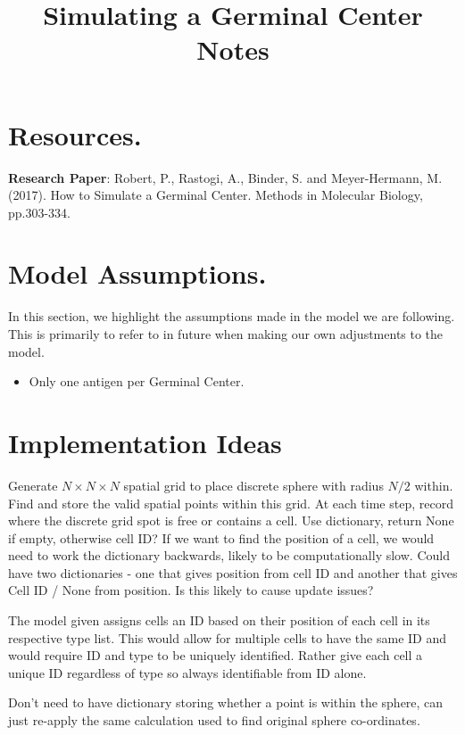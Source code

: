 \documentclass[english]{article}
\begin{document}
\title{Simulating a Germinal Center Notes}
\maketitle

\tableofcontents
\pagebreak	

\section{Resources.}
\textbf{Research Paper}: Robert, P., Rastogi, A., Binder, S. and Meyer-Hermann, M. (2017). How to Simulate a Germinal Center. Methods in Molecular Biology, pp.303-334.


\section{Model Assumptions.}
In this section, we highlight the assumptions made in the model we are following. This is primarily to refer to in future when making our own adjustments to the model. 
\begin{itemize}
\item Only one antigen per Germinal Center. 

\end{itemize}


\section{Implementation Ideas}

Generate $N\times N\times N$ spatial grid to place discrete sphere with radius $N/2$ within. Find and store the valid spatial points within this grid. At each time step, record where the discrete grid spot is free or contains a cell. Use dictionary, return None if empty, otherwise cell ID? If we want to find the position of a cell, we would need to work the dictionary backwards, likely to be computationally slow. Could have two dictionaries - one that gives position from cell ID and another that gives Cell ID / None from position. Is this likely to cause update issues?

The model given assigns cells an ID based on their position of each cell in its respective type list. This would allow for multiple cells to have the same ID and would require ID and type to be uniquely identified. Rather give each cell a unique ID regardless of type so always identifiable from ID alone. 

Don't need to have dictionary storing whether a point is within the sphere, can just re-apply the same calculation used to find original sphere co-ordinates. 
\end{document}
